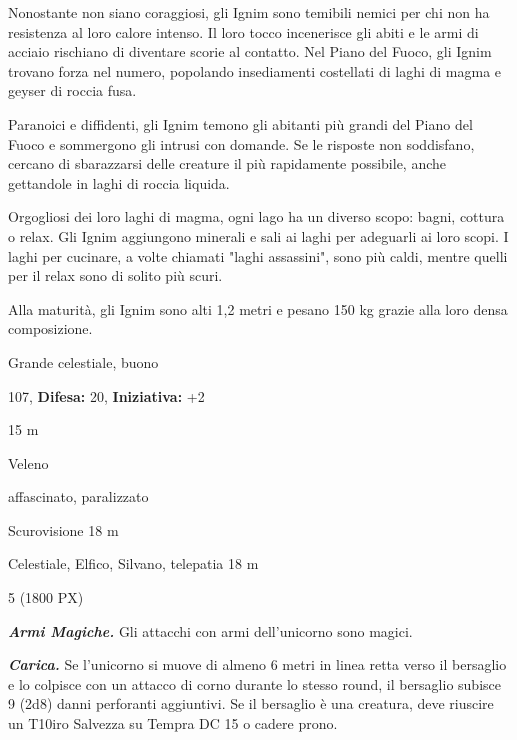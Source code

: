 \begin{multicols}{2}
{Nonostante non siano coraggiosi, gli Ignim sono temibili nemici per chi non ha resistenza al loro calore intenso. Il loro tocco incenerisce gli abiti e le armi di acciaio rischiano di diventare scorie al contatto. Nel Piano del Fuoco, gli Ignim trovano forza nel numero, popolando insediamenti costellati di laghi di magma e geyser di roccia fusa.

Paranoici e diffidenti, gli Ignim temono gli abitanti più grandi del Piano del Fuoco e sommergono gli intrusi con domande. Se le risposte non soddisfano, cercano di sbarazzarsi delle creature il più rapidamente possibile, anche gettandole in laghi di roccia liquida.

Orgogliosi dei loro laghi di magma, ogni lago ha un diverso scopo: bagni, cottura o relax. Gli Ignim aggiungono minerali e sali ai laghi per adeguarli ai loro scopi. I laghi per cucinare, a volte chiamati "laghi assassini", sono più caldi, mentre quelli per il relax sono di solito più scuri.

Alla maturità, gli Ignim sono alti 1,2 metri e pesano 150 kg grazie alla loro densa composizione.

\noindent
\begin{description}[noitemsep, topsep=0pt, parsep=0pt, partopsep=0pt, leftmargin=0cm, labelwidth=2.2cm]
	\item[\textbf{Taglia/Tipo:}] Grande celestiale, buono
	\item[\textbf{Caratt.:}] 
	\item[\textbf{Punti Ferita:}] 107,  \textbf{Difesa:} 20,  \textbf{Iniziativa:} +2
	\item[\textbf{Movimento:}] 15 m
	\item[\textbf{Tiri Salvez.:}] 
	\item[\textbf{Imm. Danni:}] Veleno
	\item[\textbf{Immunità:}] affascinato, paralizzato
	\item[\textbf{Sensi:}] Scurovisione 18 m
	\item[\textbf{Linguaggi:}] Celestiale, Elfico, Silvano, telepatia 18 m
	\item[\textbf{Sfida:}] 5 (1800 PX)\smallskip
\end{description}

\emph{\textbf{Armi Magiche.}} Gli attacchi con armi dell'unicorno sono magici.

\emph{\textbf{Carica.}} Se l'unicorno si muove di almeno 6 metri in linea retta verso il bersaglio e lo colpisce con un attacco di corno durante lo stesso round, il bersaglio subisce 9 (2d8) danni perforanti aggiuntivi. Se il bersaglio è una creatura, deve riuscire un T10iro Salvezza su Tempra DC 15 o cadere prono.

}
\end{multicols}
